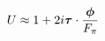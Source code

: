 \begin{equation}
U\approx 1+ 2i\mbox{\boldmath${\tau}$}\cdot \frac{\mbox{\boldmath$\phi$}}{F_\pi} 
\end{equation}

